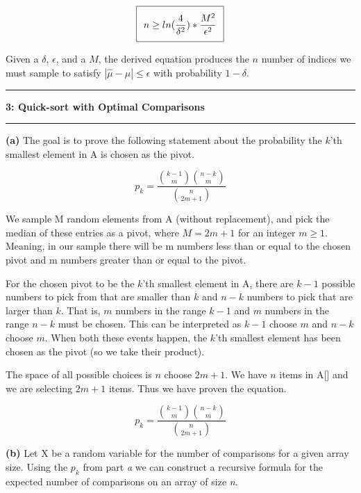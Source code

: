 \documentclass[11pt]{article}
\newcommand\question[2]{\vspace{.25in}\hrule\textbf{#1: #2}\vspace{.5em}\hrule\vspace{.10in}}
\renewcommand\part[1]{\vspace{.10in}\textbf{(#1)}}
\begin{document}
\begin{equation}
\setlength\fboxsep{0.25cm}
\setlength\fboxrule{0.4pt}
\boxed{n \geq ln(\frac{4}{\delta^2}) * \frac{M^2}{\epsilon^2}}
\end{equation}

Given a $\delta$, $\epsilon$, and a $M$, the derived equation produces the $n$ number of indices we must sample to satisfy $|\hat \mu - \mu| \leq \epsilon$ with probability $1 - \delta$.

\question{3}{Quick-sort with Optimal Comparisons}

\part{a} The goal is to prove the following statement about the probability the $k$'th smallest element in A is chosen as the pivot.

$$p_k = \frac{{k-1 \choose m} {n-k \choose m}}{{n \choose 2m+1}}$$ 

We sample M random elements from A (without replacement), and pick the median of these entries as a pivot, where $M = 2m + 1$ for an integer $m \geq 1$. Meaning, in our sample there will be m numbers less than or equal to the chosen pivot and m numbers greater than or equal to the pivot. 

For the chosen pivot to be the $k$'th smallest element in A, there are $k - 1$ possible numbers to pick from that are smaller than $k$ and $n - k$ numbers to pick that are larger than $k$. That is, $m$ numbers in the range $k - 1$ and $m$ numbers in the range $n - k$ must be chosen. This can be interpreted as $k - 1$ choose $m$ and $n - k$ choose $m$. When both these events happen, the $k$'th smallest element has been chosen as the pivot (so we take their product). 

The space of all possible choices is $n$ choose $2m + 1$. We have $n$ items in A[] and we are selecting $2m + 1$ items. Thus we have proven the equation.


$$p_k = \frac{{k-1 \choose m} {n-k \choose m}}{{n \choose 2m+1}}$$ 

\part{b} Let X be a random variable for the number of comparisons for a given array size. Using the $p_k$ from part \textit{a} we can construct a recursive formula for the expected number of comparisons on an array of size \textit{n}.
\end{document}
